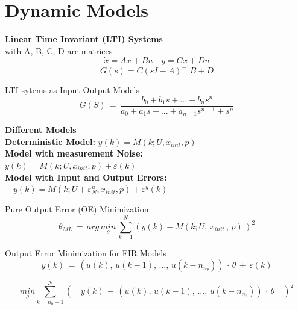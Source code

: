 \section*{Dynamic Models}
\textbf{Linear Time Invariant (LTI) Systems}\\
with A, B, C, D are matrices
\begin{equation*}
\dot { x } =Ax+Bu \quad y=Cx+Du 
\end{equation*}
\begin{equation*}
G(s)=C{ (sI-A) }^{ -1 }B+D
\end{equation*}

LTI sytems as Input-Output Models
\begin{equation*}
G(S)\, =\, \frac { b_0 + b_1s+...+b_ns^n }{ a_0+a_1s+...+a_{n-1}s^{n-1}+s^n } 
\end{equation*}

\textbf{Different Models}\\
\textbf{Deterministic Model:} \(y(k)=M(k;U,{ x }_{ init },p)\) \\
\textbf{Model with measurement Noise:} \\ \(y(k)=M(k;U,{ x }_{ init },p)+\varepsilon(k)\) \\
\textbf{Model with Input and Output Errors:} \\ \( \quad y(k)=M(k;U+{\varepsilon  }_{ N }^{ u },{ x }_{ init },p)+{ { \varepsilon }^{ y } }(k)\)


Pure Output Error (OE) Minimization
\begin{equation*}
\theta _{ ML } \, =\, arg\, \underset { \theta  }{ min } \, \sum _{ k=1 }^{ N }{ (y(k)-M(k;U,\, x_{ init }\, ,\, p)\, )^{ 2 } }
\end{equation*}

Output Error Minimization for FIR Models
\begin{equation*}
y(k) \, = \, (u(k),\, u(k-1),\, ...,\, u(k-n_{n_b})) \, \cdot \, \theta \, + \, \varepsilon(k)
\end{equation*}

\begin{equation*}
\underset { \theta  }{ min } \sum _{ k=n_{ b }+1 }^{ N }{ (\quad y(k)\, -\, (u(k),\, u(k-1),\, ...,\, u(k-n_{ n_{ b } }))\, \cdot \, \theta \quad )^{ 2 } } 
\end{equation*}


